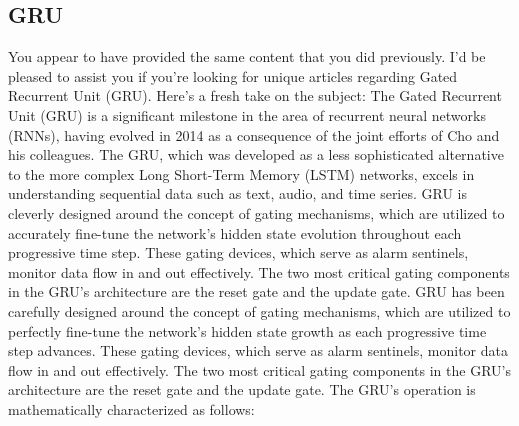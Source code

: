 \documentclass[a4paper,fleqn]{cas-sc}
\begin{document}





\subsection{GRU}
You appear to have provided the same content that you did previously. I’d be pleased to assist you if you’re looking for unique articles regarding Gated Recurrent Unit (GRU). Here’s a fresh take on the subject:
The Gated Recurrent Unit (GRU) is a significant milestone in the area of recurrent neural networks (RNNs), having evolved in 2014 as a consequence of the joint efforts of Cho and his colleagues. The GRU, which was developed as a less sophisticated alternative to the more complex Long Short-Term Memory (LSTM) networks, excels in understanding sequential data such as text, audio, and time series. GRU is cleverly designed around the concept of gating mechanisms, which are utilized to accurately fine-tune the network’s hidden state evolution throughout each progressive time step. These gating devices, which serve as alarm sentinels, monitor data flow in and out effectively.\cite{he2019wind} The two most critical gating components in the GRU’s architecture are the reset gate and the update gate. GRU has been carefully designed
around the concept of gating mechanisms, which are utilized to perfectly fine-tune the network’s hidden state growth as each progressive time step advances. These gating devices, which serve as alarm sentinels, monitor data flow in and out effectively. The two most critical gating components in the GRU’s architecture are the reset gate and the update gate. The GRU’s operation is mathematically characterized as follows:
\end{document}
